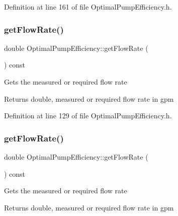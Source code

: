 Definition at line 161 of file Optimal\+Pump\+Efficiency.\+h.

\mbox{\label{class_optimal_pump_efficiency_a77c6618681b0fd3a0fc02dc49d16ee99}} 
\subsubsection{\texorpdfstring{get\+Flow\+Rate()}{getFlowRate()}\hspace{0.1cm}{\footnotesize\ttfamily [1/3]}}
{\footnotesize\ttfamily double Optimal\+Pump\+Efficiency\+::get\+Flow\+Rate (\begin{DoxyParamCaption}{ }\end{DoxyParamCaption}) const\hspace{0.3cm}{\ttfamily [inline]}}

Gets the measured or required flow rate \begin{DoxyReturn}{Returns}
double, measured or required flow rate in gpm 
\end{DoxyReturn}


Definition at line 129 of file Optimal\+Pump\+Efficiency.\+h.

\mbox{\label{class_optimal_pump_efficiency_a77c6618681b0fd3a0fc02dc49d16ee99}} 
\subsubsection{\texorpdfstring{get\+Flow\+Rate()}{getFlowRate()}\hspace{0.1cm}{\footnotesize\ttfamily [2/3]}}
{\footnotesize\ttfamily double Optimal\+Pump\+Efficiency\+::get\+Flow\+Rate (\begin{DoxyParamCaption}{ }\end{DoxyParamCaption}) const\hspace{0.3cm}{\ttfamily [inline]}}

Gets the measured or required flow rate \begin{DoxyReturn}{Returns}
double, measured or required flow rate in gpm 
\end{DoxyReturn}


